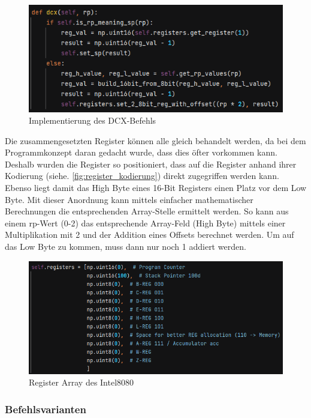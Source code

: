 \documentclass[12pt]{article}
\newcommand{\imgSpaceBefore}{\vspace{10pt}}
\begin{document}
\imgSpaceBefore
\begin{figure}[H]
\centering
\includegraphics[width=15cm]{Bilder/dcx_impl}
\caption{Implementierung des DCX-Befehls}
\label{fig:dcx_impl}
\end{figure}

\noindent
Die zusammengesetzten Register können alle gleich behandelt werden, da bei dem Programmkonzept daran gedacht wurde, dass dies öfter vorkommen kann. Deshalb wurden die Register so positioniert, dass auf die Register anhand ihrer Kodierung (siehe. \ref{fig:register_kodierung}) direkt zugegriffen werden kann. Ebenso liegt damit das High Byte eines 16-Bit Registers einen Platz vor dem Low Byte. Mit dieser Anordnung kann mittels einfacher mathematischer Berechnungen die entsprechenden Array-Stelle ermittelt werden. So kann aus einem rp-Wert (0-2) das entsprechende Array-Feld (High Byte) mittels einer Multiplikation mit 2 und der Addition eines Offsets berechnet werden. Um auf das Low Byte zu kommen, muss dann nur noch 1 addiert werden.

\imgSpaceBefore
\begin{figure}[H]
\centering
\includegraphics[width=15cm]{Bilder/register_array}
\caption{Register Array des Intel8080}
\label{fig:reg_array}
\end{figure}


\noindent


\subsubsection{Befehlsvarianten}
\end{document}
